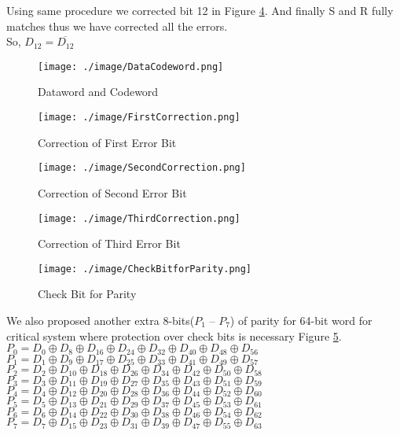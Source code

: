 \documentclass[12pt,a4paper]{report}
\begin{document}
Using same procedure we corrected bit 12 in Figure \ref{fig:ThirdCorrection}. And finally S and R fully matches thus we have corrected all the errors.\\
So, $D_{12}=\overline{D_{12}}$

  \begin{figure}
   \centering
    \texttt{[image: ./image/DataCodeword.png]}
    \caption{Dataword and Codeword}
    \label{fig:DataCodeword}
   \end{figure}
   
  \begin{figure}
   \centering
    \texttt{[image: ./image/FirstCorrection.png]}
    \caption{Correction of First Error Bit}
    \label{fig:FirstCorrection}
   \end{figure}
   
  \begin{figure}
   \centering
    \texttt{[image: ./image/SecondCorrection.png]}
    \caption{Correction of Second Error Bit}
    \label{fig:SecondCorrection}
   \end{figure}
 
 
  \begin{figure}
   \centering
    \texttt{[image: ./image/ThirdCorrection.png]}
    \caption{Correction of Third Error Bit}
    \label{fig:ThirdCorrection}
   \end{figure}
   
 \begin{figure}
   \centering
   \texttt{[image: ./image/CheckBitforParity.png]}
   \caption{Check Bit for Parity}
   \label{fig:CheckBitforParity}
 \end{figure}
 
 We also proposed another extra 8-bits($P_1$ -- $P_7$) of parity for 64-bit word for critical system where protection over check bits is necessary Figure \ref{fig:CheckBitforParity}.\\
  $P_0 = D_0 \oplus D_8 \oplus D_{16} \oplus D_{24} \oplus D_{32} \oplus D_{40} \oplus D_{48} \oplus D_{56}$\\
  $P_1 = D_1 \oplus D_9 \oplus D_{17} \oplus D_{25} \oplus D_{33} \oplus D_{41} \oplus D_{49} \oplus D_{57}$\\
  $P_2 = D_2 \oplus D_{10} \oplus D_{18} \oplus D_{26} \oplus D_{34} \oplus D_{42} \oplus D_{50} \oplus D_{58}$\\
  $P_3 = D_3 \oplus D_{11} \oplus D_{19} \oplus D_{27} \oplus D_{35} \oplus D_{43} \oplus D_{51} \oplus D_{59}$\\	
  $P_4 = D_4 \oplus D_{12} \oplus D_{20} \oplus D_{28} \oplus D_{36} \oplus D_{44} \oplus D_{52} \oplus D_{60}$\\
  $P_5 = D_5 \oplus D_{13} \oplus D_{21} \oplus D_{29} \oplus D_{37} \oplus D_{45} \oplus D_{53} \oplus D_{61}$\\
  $P_6 = D_6 \oplus D_{14} \oplus D_{22} \oplus D_{30} \oplus D_{38} \oplus D_{46} \oplus D_{54} \oplus D_{62}$\\
  $P_7 = D_7 \oplus D_{15} \oplus D_{23} \oplus D_{31} \oplus D_{39} \oplus D_{47} \oplus D_{55} \oplus D_{63}$
   
\end{document}
